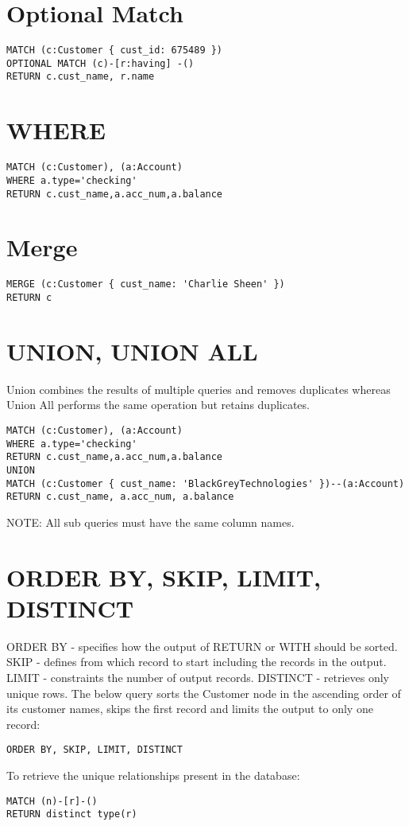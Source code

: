 \documentclass[../main.tex]{subfiles}
\begin{document}
\section{Optional Match}
\begin{lstlisting}[language=cypher]
MATCH (c:Customer { cust_id: 675489 })
OPTIONAL MATCH (c)-[r:having] -()
RETURN c.cust_name, r.name
\end{lstlisting}

\section{WHERE}
\begin{lstlisting}[language=cypher]
MATCH (c:Customer), (a:Account)
WHERE a.type='checking'
RETURN c.cust_name,a.acc_num,a.balance
\end{lstlisting}

\section{Merge}
\begin{lstlisting}[language=cypher]
MERGE (c:Customer { cust_name: 'Charlie Sheen' })
RETURN c
\end{lstlisting}


\section{UNION, UNION ALL}
Union combines the results of multiple queries and removes duplicates whereas Union All performs the same operation but retains duplicates.
\begin{lstlisting}[language=cypher]
MATCH (c:Customer), (a:Account)
WHERE a.type='checking'
RETURN c.cust_name,a.acc_num,a.balance
UNION
MATCH (c:Customer { cust_name: 'BlackGreyTechnologies' })--(a:Account)
RETURN c.cust_name, a.acc_num, a.balance
\end{lstlisting}
NOTE: All sub queries must have the same column names.

\section{ORDER BY, SKIP, LIMIT, DISTINCT}
ORDER BY - specifies how the output of RETURN or WITH should be sorted.
SKIP - defines from which record to start including the records in the output.
LIMIT - constraints the number of output records.
DISTINCT - retrieves only unique rows.
The below query sorts the Customer node in the ascending order of its customer names, skips the first record and limits the output to only one record:
\begin{lstlisting}[language=cypher]
ORDER BY, SKIP, LIMIT, DISTINCT
\end{lstlisting}
To retrieve the unique relationships present in the database:
\begin{lstlisting}[language=cypher]
MATCH (n)-[r]-()
RETURN distinct type(r)
\end{lstlisting}
\end{document}
